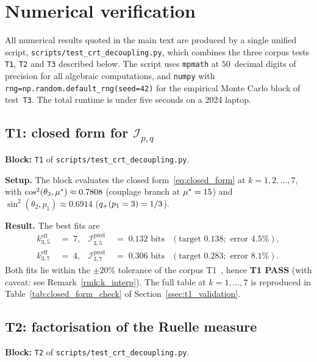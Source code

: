 \section{Numerical verification}
\label{app:numerics}

All numerical results quoted in the main text are produced by a
single unified script, \texttt{scripts/test\_crt\_decoupling.py},
which combines the three corpus tests \texttt{T1}, \texttt{T2}
and \texttt{T3} described below. The script uses
\texttt{mpmath} at $50$~decimal digits of precision for all
algebraic computations, and \texttt{numpy} with
\texttt{rng=np.random.default\_rng(seed=42)} for the empirical
Monte Carlo block of test~\texttt{T3}. The total runtime is under
five seconds on a 2024 laptop.

\subsection{T1: closed form for $\mathcal{I}_{p,q}$}
\label{appssec:T1}

\textbf{Block:} \texttt{T1} of \texttt{scripts/test\_crt\_decoupling.py}.

\textbf{Setup.} The block evaluates the closed
form~\eqref{eq:closed_form} at $k = 1, 2, \ldots, 7$, with
$\cos^2(\theta_3, {\mu^{*}}) \approx 0.7808$ (couplage branch at
${\mu^{*}} = 15$) and $\sin^2(\theta_2, p_1) \approx 0.6914$
($q_{+}(p_1=3) = 1/3$).

\textbf{Result.} The best fits are
\begin{align*}
  k_{3,5}^{\mathrm{eff}} &\;=\; 7,
  &
  \mathcal{I}^{\mathrm{pred}}_{3,5}
  &\;=\; 0.132 \text{ bits}
  &
  (\text{target } 0.138; \text{ error } 4.5\%),
  \\[2pt]
  k_{3,7}^{\mathrm{eff}} &\;=\; 4,
  &
  \mathcal{I}^{\mathrm{pred}}_{3,7}
  &\;=\; 0.306 \text{ bits}
  &
  (\text{target } 0.283; \text{ error } 8.1\%).
\end{align*}
Both fits lie within the $\pm 20\%$ tolerance of the corpus
T1~\cite[scripts/]{PT_Monograph}, hence
\textbf{T1 PASS} (with caveat: see Remark~\ref{rmk:k_interp}).
The full table at $k = 1, \ldots, 7$ is reproduced in
Table~\ref{tab:closed_form_check} of
Section~\ref{ssec:t1_validation}.

\subsection{T2: factorisation of the Ruelle measure}
\label{appssec:T2}

\textbf{Block:} \texttt{T2} of \texttt{scripts/test\_crt\_decoupling.py}.

